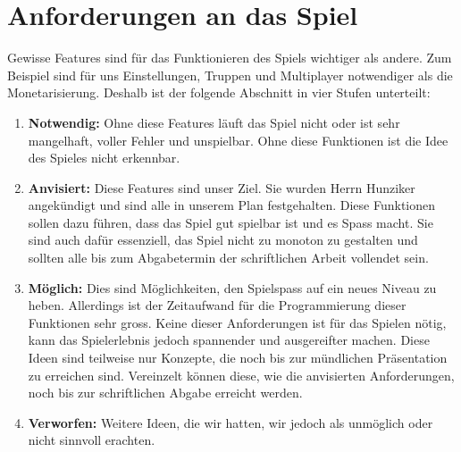 \section{Anforderungen an das Spiel}
\label{chap:foo}
Gewisse \glspl{Feature} sind für das Funktionieren des Spiels wichtiger als andere.
Zum Beispiel sind für uns Einstellungen, Truppen und \gls{Multiplayer} notwendiger als die Monetarisierung.
Deshalb ist der folgende Abschnitt in vier Stufen unterteilt:
\begin{enumerate}
    \item \textbf{Notwendig:}
        Ohne diese Features läuft das Spiel nicht oder ist sehr mangelhaft,
        voller Fehler und unspielbar. Ohne diese Funktionen ist die Idee des Spieles nicht erkennbar.
    \item \textbf{Anvisiert:}
        Diese Features sind unser Ziel. Sie wurden Herrn Hunziker angekündigt und sind alle in unserem Plan festgehalten.
        Diese Funktionen sollen dazu führen, dass das Spiel
        gut spielbar ist und es Spass macht. Sie sind auch dafür essenziell, das Spiel nicht zu monoton zu gestalten und sollten
        alle bis zum Abgabetermin der schriftlichen Arbeit vollendet sein.
    \item \textbf{Möglich:}
        Dies sind Möglichkeiten, den Spielspass auf ein neues Niveau zu heben. Allerdings ist der Zeitaufwand für die Programmierung dieser Funktionen sehr gross.
        Keine dieser Anforderungen ist für das Spielen nötig,
        kann das Spielerlebnis jedoch spannender und ausgereifter machen. Diese
        Ideen sind teilweise nur Konzepte, die noch bis zur mündlichen Präsentation zu erreichen sind.
        Vereinzelt können diese, wie die anvisierten Anforderungen, noch bis zur schriftlichen Abgabe erreicht werden.
    \item \textbf{Verworfen:}
        Weitere Ideen, die wir hatten, wir jedoch als unmöglich oder nicht sinnvoll erachten.
\end{enumerate}

